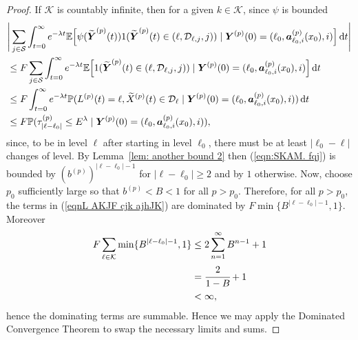 \begin{proof}
	If \(\mathcal K\) is countably infinite, then for a given \(k\in\mathcal K\), since \(\psi\) is bounded
	\begin{align}
		&\Bigg|\sum_{j\in\mathcal S}\int_{t=0}^\infty e^{-\lambda t}\mathbb E\Big[\psi(\widetilde{\boldsymbol Y}^{(p)}(t)) 1(\widetilde{\boldsymbol Y}^{(p)}(t)\in(\ell,\mathcal D_{\ell,j},j))  \mid 
		\boldsymbol Y^{(p)}(0)=(\ell_0, \boldsymbol  a_{\ell_0,i}^{(p)}(x_0), i) \Big] \, \mathrm{d} t\Bigg| \nonumber 
		\\&\leq F \sum_{j\in\mathcal S}\int_{t=0}^\infty e^{-\lambda t}\mathbb E\Big[ 1(\widetilde{\boldsymbol Y}^{(p)}(t)\in(\ell,\mathcal D_{\ell,j},j))  \mid \nonumber 
		 \boldsymbol Y^{(p)}(0)=(\ell_0, \boldsymbol  a_{\ell_0,i}^{(p)}(x_0), i) \Big] \, \mathrm{d} t \nonumber 
		\\&\leq F  \int_{t=0}^\infty e^{-\lambda t}\mathbb P( L^{(p)}(t)=\ell, \widetilde X^{(p)}(t) \in \mathcal D_{\ell} \mid   
		\boldsymbol Y^{(p)}(0)=(\ell_0, \boldsymbol  a_{\ell_0,i}^{(p)}(x_0), i) )\, \mathrm{d} t \nonumber 
		\\&\leq F \mathbb P(\tau_{|\ell-\ell_0|}^{(p)}\leq E^\lambda \mid
			\boldsymbol Y^{(p)}(0)=(\ell_0, \boldsymbol  a_{\ell_0,i}^{(p)}(x_0), i)), \label{eqn:SKAM. fqj}
	\end{align}
	since, to be in level \(\ell\) after starting in level \(\ell_0\), there must be at least \(|\ell_0-\ell|\) changes of level. By Lemma~\ref{lem: another bound 2} then (\ref{eqn:SKAM. fqj}) is bounded by \(\left(b^{(p)}\right)^{|\ell-\ell_0|-1}\) for \(|\ell-\ell_0|\geq 2\) and by \(1\) otherwise. Now, choose \(p_0\) sufficiently large so that \(b^{(p)}<B<1\) for all \(p>p_0\). Therefore, for all \(p>p_0\), the terms in (\ref{eqnL AKJF cjk ajhJK}) are dominated by \(F\min\{B^{|\ell-\ell_0|-1},1\}\). Moreover 
	\begin{align*}
		F\sum_{\ell\in\mathcal K} \min\{B^{|\ell-\ell_0|-1},1\} 
		&\leq2\sum_{n=1}^\infty B^{n-1}+1
		\\&=\cfrac{2}{1-B}+1
		\\&<\infty,
	\end{align*}
	hence the dominating terms are summable. Hence we may apply the Dominated Convergence Theorem to swap the necessary limits and sums. 
\end{proof} 

